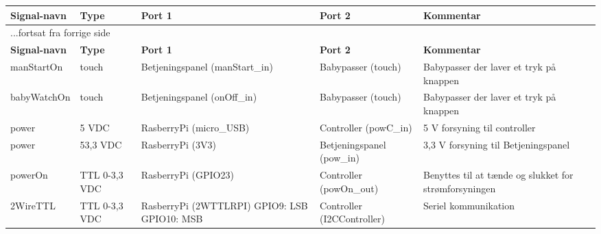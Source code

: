 \begin{center}
\label{ctrl:signaltabel}
\begin{longtable}{|p{}|p{}|p{}|p{}|p{3cm}|}
\hline
\textbf{Signal-navn}	&\textbf{Type} 		&\textbf{Port 1} 	&\textbf{Port 2} 			&\textbf{Kommentar} \\ \hline
\endfirsthead
\multicolumn{5}{l}{...fortsat fra forrige side} \\ \hline 
\textbf{Signal-navn}	&\textbf{Type} 		&\textbf{Port 1} 	&\textbf{Port 2} 			&\textbf{Kommentar} \\ \hline
\endhead


manStartOn
&touch
&Betjeningspanel \newline (manStart\_in)
&Babypasser \newline (touch)
&Babypasser der laver et tryk på knappen
\\\hline

babyWatchOn
&touch
&Betjeningspanel \newline (onOff\_in)
&Babypasser \newline (touch)
&Babypasser der laver et tryk på knappen
\\\hline

power
&5 VDC
&RasberryPi \newline(micro\_USB) 
&Controller \newline(powC\_in)
&5 V forsyning til controller
\\\hline
power
&53,3 VDC
&RasberryPi \newline(3V3) 
&Betjeningspanel \newline (pow\_in)
&3,3 V forsyning til Betjeningspanel
\\\hline


powerOn			
&TTL 0-3,3 VDC	
&RasberryPi \newline (GPIO23)				
&Controller \newline (powOn\_out) 			
&Benyttes til at tænde og slukket for strømforsyningen   				\\\hline

2WireTTL		
&TTL 0-3,3 VDC			
&RasberryPi \newline (2WTTLRPI) \newline	
	GPIO9: LSB \newline	
	GPIO10: MSB \newline	
&Controller \newline (I2CController) 			
&Seriel kommunikation
\\\hline


\end{longtable}
\end{center}
